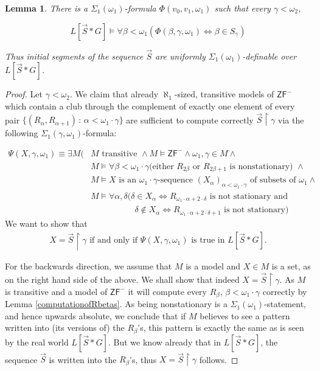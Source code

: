 \documentclass[a4paper,12pt]{article}
\newtheorem{lemma}[theorem]{Lemma}
\newcommand{\ZFP}{\mathsf{ZF}^-}
\begin{document}
\begin{lemma}\label{definabilityofvecS}
There is a $\Sigma_1(\omega_1)$-formula $\Phi(v_0,v_1,\omega_1)$ such that every $\gamma < \omega_2$,

\[ L[\vec{S} \ast G] \models \forall \beta < \omega_1 (\Phi (\beta, \gamma,\omega_1) \Leftrightarrow \beta \in S_{\gamma}) \]
 
Thus initial segments  of the sequence $\vec{S} $ are uniformly  $\Sigma_1(\omega_1)$-definable over $L[\vec{S} \ast G]$.
\end{lemma}
\begin{proof}
Let $\gamma < \omega_2$.
We claim that already $\aleph_1$-sized, transitive models of $\ZFP$ which contain a club through the complement of exactly one element of every pair $\{(R_{\alpha}, R_{\alpha+1}) \, : \, \alpha < \omega_1 \cdot \gamma\}$ are sufficient to compute correctly $\vec{S} \upharpoonright \gamma$ via the following $\Sigma_1(\gamma, \omega_1)$-formula: 

\begin{align*}
\Psi(X,\gamma, \omega_1) \equiv  \exists M (&M \text{ transitive } \land M \models \ZFP \land \omega_1,\gamma \in M \land
\\& M \models \forall \beta< \omega_1 \cdot \gamma (\text{either  $R_{2\beta}$ or $R_{2\beta+1}$ is nonstationary) } \land \\& 
M \models X \text{ is an $\omega_1 \cdot \gamma$-sequence $(X_{\alpha})_{\alpha < \omega_1 \cdot \gamma}$ of subsets of $\omega_1$} \land\\&
M \models  \forall \alpha, \delta (\delta \in X_{\alpha} \Leftrightarrow R_{\omega_1 \cdot \alpha + 2 \cdot \delta} \text{ is not stationary and} \\& \qquad \qquad \quad \,
\delta \notin X_{\alpha} \Leftrightarrow  R_{\omega_1 \cdot \alpha + 2 \cdot \delta +1} \text{ is not stationary})
\end{align*}
We want to show that 
\begin{align*}
X=\vec{S} \upharpoonright \gamma \text{ if and only if } \Psi(X,\gamma,\omega_1) \text{ is true in }L[\vec{S} \ast G].
\end{align*}

For the backwards direction, we assume that $M$ is a model and $X \in M$ is a set, as on the right hand side of the above. We shall show that indeed $X=\vec{S}\upharpoonright \gamma$.  As $M$ is transitive and a model of $\ZFP$ it will compute every $R_{\beta}$, $\beta < \omega_1 \cdot \gamma$ correctly by Lemma \ref{computationofRbetas}. As being nonstationary is a $\Sigma_1(\omega_1)$-statement, and hence upwards absolute, we conclude that if $M$ believes to see a pattern written into (its versions of) the $R_{\beta}$'s, this pattern is exactly the same as is seen by the real world $L[\vec{S} \ast G]$. But we know already that in $L[\vec{S} \ast G]$, the sequence $\vec{S}$ is written into the $R_{\beta}$'s, thus $X=\vec{S} \upharpoonright \gamma$ follows.


\end{proof}
\end{document}
